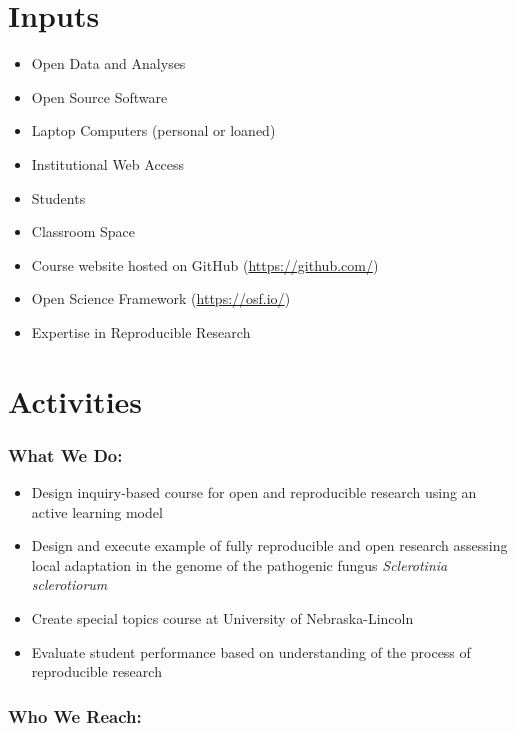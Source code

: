 \documentclass[12pt,letterpaper]{article}
\begin{document}
\section{Inputs}


\begin{itemize}
	\item Open Data and Analyses
	\item Open Source Software
	\item Laptop Computers (personal or loaned)
	\item Institutional Web Access
	\item Students
	\item Classroom Space
	\item Course website hosted on GitHub (\url{https://github.com/})
	\item Open Science Framework (\url{https://osf.io/})
	\item Expertise in Reproducible Research
\end{itemize}

\section{Activities}

\subsubsection{What We Do:}

\begin{itemize}
	\item Design inquiry-based course for open and reproducible research using an active learning model
	\item Design and execute example of fully reproducible and open research assessing local adaptation in the genome of the pathogenic fungus \textit{Sclerotinia sclerotiorum}
	\item Create special topics course at University of Nebraska-Lincoln
	\item Evaluate student performance based on understanding of the process of reproducible research
\end{itemize}

\subsubsection{Who We Reach:}
\end{document}
